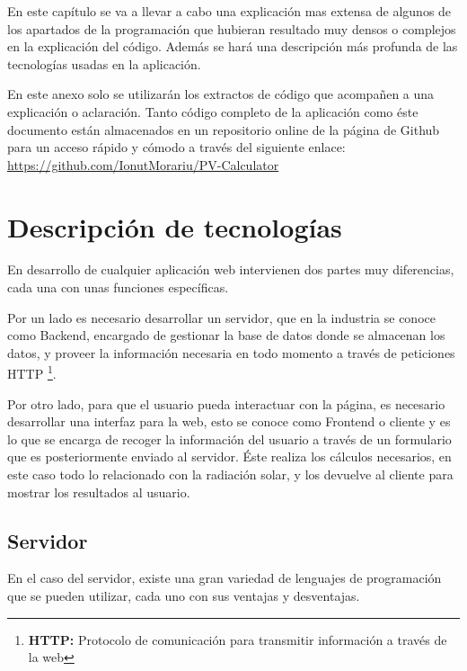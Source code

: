 En este capítulo se va a llevar a cabo una explicación mas extensa de algunos de los apartados de la programación que hubieran resultado muy densos o complejos en la explicación del código. Además se hará una descripción más profunda de las tecnologías usadas en la aplicación.

En este anexo solo se utilizarán los extractos de código que acompañen a una explicación o aclaración. Tanto código completo de la aplicación como éste documento están almacenados en un repositorio online de la página de Github para un acceso rápido y cómodo a través del siguiente enlace: \url{https://github.com/IonutMorariu/PV-Calculator}

\section{Descripción de tecnologías}

En desarrollo de cualquier aplicación web intervienen dos partes muy diferencias, cada una con unas funciones específicas. 

Por un lado es necesario desarrollar un servidor, que en la industria se conoce como Backend, encargado de gestionar la base de datos donde se almacenan los datos, y proveer la información necesaria en todo momento a través de peticiones HTTP \footnote{ \textbf{HTTP:} Protocolo de comunicación para transmitir información a través de la web}.

Por otro lado, para que el usuario pueda interactuar con la página, es necesario desarrollar una interfaz para la web, esto se conoce como Frontend o cliente y es lo que se encarga de recoger la información del usuario a través de un formulario que es posteriormente enviado al servidor. Éste realiza los cálculos necesarios, en este caso todo lo relacionado con la radiación solar, y los devuelve al cliente para mostrar los resultados al usuario.

\subsection{Servidor}

En el caso del servidor, existe una gran variedad de lenguajes de programación que se pueden utilizar, cada uno con sus ventajas y desventajas.

